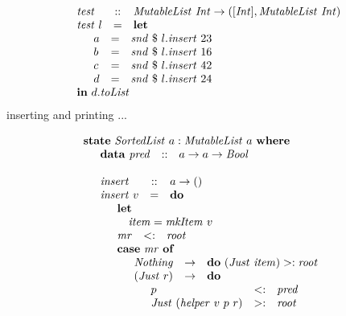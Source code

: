 \documentclass[runningheads,a4paper]{llncs}
\begin{document}
\begin{displaymath}
\begin{array}{lcl}
\mathit{test} & :: & \mathit{MutableList}~\mathit{Int} \to ([\mathit{Int}], \mathit{MutableList}~\mathit{Int})\\
\mathit{test}~l & = & \mathbf{let} \\
\multicolumn{3}{l}{\quad \begin{array}{lcl}
a & = & \mathit{snd}~\$~l.\mathit{insert}~23\\
b & = & \mathit{snd}~\$~l.\mathit{insert}~16\\
c & = & \mathit{snd}~\$~l.\mathit{insert}~42\\
d & = & \mathit{snd}~\$~l.\mathit{insert}~24\\
\end{array}}\\
\multicolumn{3}{l}{\mathbf{in}~d.\mathit{toList}}
\end{array}
\end{displaymath}
inserting and printing ...

\begin{displaymath}
\begin{array}{l}
\mathbf{state}~\mathit{SortedList}~a : \mathit{MutableList}~a~\mathbf{where} \\
\quad \begin{array}{lcl}
\mathbf{data}~\mathit{pred}  & :: & a \to a \to \mathit{Bool}
\end{array}\\\\
\quad \begin{array}{lcl}
\mathit{insert} & :: & a \to ()\\
\mathit{insert}~v & = & \mathbf{do} \\
\multicolumn{3}{l}{\quad \begin{array}{lcl}
\multicolumn{3}{l}{\mathbf{let}}\\
\multicolumn{3}{l}{\quad \mathit{item} = \mathit{mkItem}~v} \\
\mathit{mr} & <: & \mathit{root} \\
\multicolumn{3}{l}{\mathbf{case}~\mathit{mr}~\mathbf{of}} \\
\multicolumn{3}{l}{\quad \begin{array}{lcl}
\mathit{Nothing} & \to & \mathbf{do}~(\mathit{Just}~\mathit{item}) >: \mathit{root} \\
(\mathit{Just}~r) & \to & \mathbf{do} \\
\multicolumn{3}{l}{\quad \begin{array}{lcl}
p & <: & \mathit{pred} \\
\mathit{Just}~(\mathit{helper}~v~p~r) & >: & \mathit{root}
\end{array}}
\end{array}}
\end{array}}
\end{array}
\end{array}
\end{displaymath}
\end{document}
